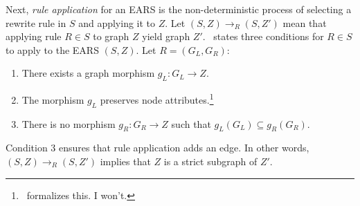\documentclass{article}
\begin{document}
Next, \emph{rule application} for an EARS is the non-deterministic process of selecting a rewrite rule in $S$ and applying it to $Z$.
Let $(S, Z) \rightarrow_R (S, Z')$ mean that applying rule $R \in S$ to graph $Z$ yield graph $Z'$.
\assmann\ states three conditions for $R \in S$ to apply to the EARS $(S, Z)$.
Let $R = (G_L, G_R)$:
\begin{enumerate}
\item There exists a graph morphism $g_L : G_L \rightarrow Z$.
\item The morphism $g_L$ preserves node attributes.\footnote{\assmann\ formalizes this. I won't.}
\item There is no morphism $g_R : G_R \rightarrow Z$ such that $g_L(G_L) \subseteq g_R(G_R)$.
\end{enumerate}
Condition 3 ensures that rule application adds an edge.
In other words, $(S,Z) \rightarrow_R (S,Z')$ implies that $Z$ is a strict subgraph of $Z'$.
\end{document}
